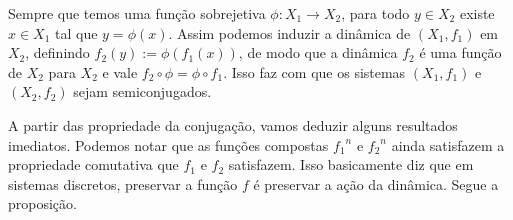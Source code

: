 \begin{figure}
\centering







\end{figure}

Sempre que temos uma função sobrejetiva $\phi: X_1 \to X_2$, para todo $y \in X_2$ existe $x \in X_1$ tal que $y=\phi(x)$. Assim podemos induzir a dinâmica de $(X_1,f_1)$ em $X_2$, definindo $f_2(y) := \phi(f_1 (x))$, de modo que a dinâmica $f_2$ é uma função de $X_2$ para $X_2$ e vale $f_2 \circ \phi = \phi \circ f_1$. Isso faz com que os sistemas $(X_1,f_1)$ e $(X_2,f_2)$ sejam semiconjugados.

A partir das propriedade da conjugação, vamos deduzir alguns resultados imediatos. Podemos notar que as funções compostas ${f_1}^n$ e ${f_2}^n$ ainda satisfazem a propriedade comutativa que $f_1$ e $f_2$ satisfazem. Isso basicamente diz que em sistemas discretos, preservar a função $f$ é preservar a ação da dinâmica. Segue a proposição.

